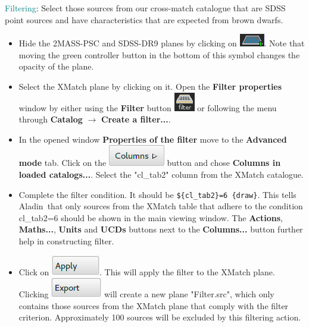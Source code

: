 \documentclass [a4paper, 12pt]{article}
\newcommand{\aladin}{{\textsc{A}{ladin}}}
\begin{document}
\noindent \textcolor{teal}{Filtering}: Select those sources from our 
cross-match catalogue that are SDSS point sources and have characteristics that 
are expected from brown dwarfs. 
\begin{itemize}
    \item Hide the 2MASS-PSC and SDSS-DR9 planes by clicking on  
    \includegraphics[width=0.06 
    \textwidth]{../images/aladin_button_table.png}. Note that moving the green 
    controller button in the bottom of this symbol changes the opacity of the 
    plane. 
    \item Select the XMatch plane by clicking on it. Open the \textbf{Filter 
    properties} window by either using the \textbf{Filter} button 
    \includegraphics[width=0.04 
    \textwidth]{../images/aladin_button_filter.png} or following the menu 
    through \textbf{Catalog} $\rightarrow$ \textbf{Create a filter...}. 
    \item In the opened window \textbf{Properties of the filter} move to the 
    \textbf{Advanced mode} tab. Click on the \includegraphics[width=0.1 
    \textwidth]{../images/aladin_filter_columns.png} button and chose 
    \textbf{Columns in loaded catalogs...}. Select the "cl\_tab2" column from 
    the XMatch catalogue. 
    \item Complete the filter condition. It should be \texttt{\$\{cl\_tab2\}=6 
    \{draw\}}. This tells \aladin\, that only sources from the XMatch table 
    that adhere to the condition cl\_tab2=6 should be shown in the main viewing 
    window. The 
    \textbf{Actions}, \textbf{Maths...}, \textbf{Units} and \textbf{UCDs} 
    buttons next to the \textbf{Columns...} button further help in constructing 
    filter. 
    \item Click on \includegraphics[width=0.1 
    \textwidth]{../images/aladin_filter_apply.png}. This will apply the filter 
    to the XMatch plane. Clicking \includegraphics[width=0.1 
    \textwidth]{../images/aladin_filter_export.png} will create a new plane 
    "Filter.src", which only contains those sources from the XMatch plane that 
    comply with the filter criterion. Approximately 100 sources will be 
    excluded by this filtering action. 
\end{itemize}
\end{document}
